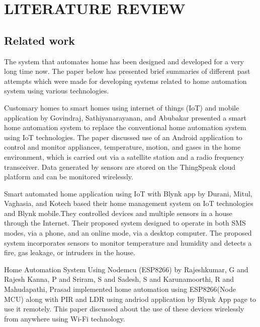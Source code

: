 \documentclass[12pt,a4paper]{report}
\begin{document}
	\chapter{LITERATURE REVIEW}
	
	\section{Related work}
	\begin{justify}
		The system that automates home  has been designed and developed for a very long time now. The paper below has presented brief summaries of different past attempts which were made for developing systems related to home automation system using various technologies.
	\end{justify}
	
	
	\begin{justify}
		
		
		
		Customary homes to smart homes using internet of things (IoT) and mobile application by Govindraj,  Sathiyanarayanan, and Abubakar \cite{govindraj2017customary} presented a smart home automation system to replace the conventional home automation system using IoT technologies. The paper discussed use of  an Android application to control and monitor appliances, temperature, motion, and gases in the home environment, which is carried out via a satellite station and a radio frequency transceiver. Data generated by sensors are stored on the ThingSpeak cloud platform and can be monitored wirelessly.
	\end{justify}
	\begin{justify}
		Smart automated home application using IoT with Blynk app by Durani, Mitul, Vaghasia, and Kotech \cite{durani2018smart} based their home management system on IoT technologies and Blynk mobile.They controlled devices and multiple sensors in a house through the Internet. Their proposed system  designed to operate in both SMS  modes, via a phone, and an online mode, via a desktop computer. The proposed system incorporates sensors to monitor temperature and humidity and detects a fire, gas leakage, or intruders in the house.
	\end{justify}
	
	\begin{justify}
		
		
		Home Automation System Using Nodemcu (ESP8266) by Rajeshkumar, G and Rajesh Kanna, P and Sriram, S and Sadesh, S and Karunamoorthi, R and Mahudapathi, Prasad \cite{rajeshkumar2022home} implemented home  automation using ESP8266(Node MCU) along with PIR and LDR using andriod application by Blynk App page to use it remotely. This paper discussed about the use of these  devices wirelessly from anywhere using  Wi-Fi technology. 
	\end{justify}
	
\end{document}
